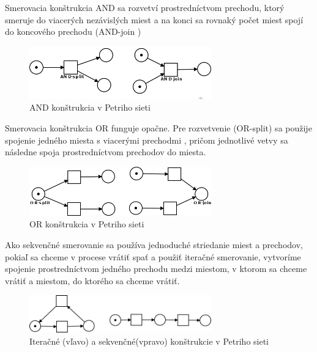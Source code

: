Smerovacia konštrukcia AND sa rozvetví prostredníctvom prechodu, ktorý smeruje do viacerých nezávislých miest a na konci sa rovnaký počet miest spojí do koncového prechodu (AND-join )
\begin{figure}[h]
	\centerline{\includegraphics[width=0.7\textwidth]{images/and}}
	\caption{AND konštrukcia v Petriho sieti}
	\label{obr:and cursus}
\end{figure}

Smerovacia konštrukcia OR funguje opačne. Pre rozvetvenie (OR-split) sa použije spojenie jedného miesta s viacerými prechodmi , pričom jednotlivé vetvy sa následne spoja prostredníctvom prechodov do miesta.
\begin{figure}[h]
	\centerline{\includegraphics[width=0.7\textwidth]{images/or}}
	\caption{OR konštrukcia v Petriho sieti}
	\label{obr:or cursus}
\end{figure}

Ako sekvenčné smerovanie sa používa jednoduché striedanie miest a prechodov, pokiaľ sa chceme v procese vrátiť spať a použiť iteračné smerovanie, vytvoríme spojenie prostredníctvom jedného prechodu medzi miestom, v ktorom sa chceme vrátiť a miestom, do ktorého sa chceme vrátiť. 
\begin{figure}[h]
	\centerline{\includegraphics[width=0.7\textwidth]{images/iteracia}}
	\caption[Sekvenčné a iteračné konštrukcie v Petriho sieti]{Iteračné (vľavo) a sekvenčné(vpravo) konštrukcie v Petriho sieti}
	\label{obr:iteracia cursus}
\end{figure}



